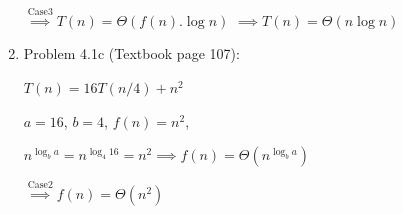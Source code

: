 \documentclass[11pt]{article}
\begin{document}
\begin{enumerate}
    $ \overset{\mathrm{Case 3}}{\implies} T(n)=\Theta(f(n).\log{n})$
    $ \overset{}{\implies} T(n)=\Theta(n\log{n})$





	

\item Problem 4.1c (Textbook page 107):

	$T(n)=16T(n/4)+n^{2}$
	
	$a=16$, $b=4$, $f(n)=n^{2}$,
	
	$n^{\log_b{a}} \overset{}{=} n^{\log_{4}{16}}=n^{2}  
	\overset{}{\implies} f(n)=\Theta(n^{\log_b{a}})$
	
	$	\overset{\mathrm{Case 2}}{\implies} f(n)=\Theta(n^{2})$
	























   
\end{enumerate}
\end{document}

